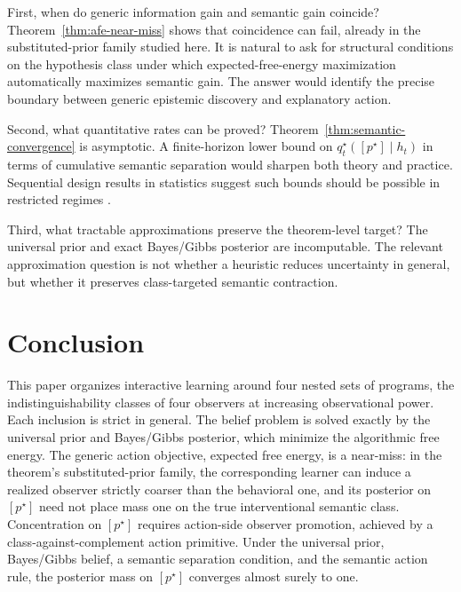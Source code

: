 \documentclass[11pt]{article}
\theoremstyle{definition}
\theoremstyle{remark}
\begin{document}
First, when do generic information gain and semantic gain coincide? Theorem~\ref{thm:afe-near-miss} shows that coincidence can fail, already in the substituted-prior family studied here. It is natural to ask for structural conditions on the hypothesis class under which expected-free-energy maximization automatically maximizes semantic gain. The answer would identify the precise boundary between generic epistemic discovery and explanatory action.

Second, what quantitative rates can be proved? Theorem~\ref{thm:semantic-convergence} is asymptotic. A finite-horizon lower bound on $q_t^\star([p^\star]\mid h_t)$ in terms of cumulative semantic separation would sharpen both theory and practice. Sequential design results in statistics suggest such bounds should be possible in restricted regimes \citep{Chernoff1959,BoxHill1967}.

Third, what tractable approximations preserve the theorem-level target? The universal prior and exact Bayes/Gibbs posterior are incomputable. The relevant approximation question is not whether a heuristic reduces uncertainty in general, but whether it preserves class-targeted semantic contraction.

\section{Conclusion}
\label{sec:conclusion}

This paper organizes interactive learning around four nested sets of programs, the indistinguishability classes of four observers at increasing observational power. Each inclusion is strict in general. The belief problem is solved exactly by the universal prior and Bayes/Gibbs posterior, which minimize the algorithmic free energy. The generic action objective, expected free energy, is a near-miss: in the theorem's substituted-prior family, the corresponding learner can induce a realized observer strictly coarser than the behavioral one, and its posterior on $[p^\star]$ need not place mass one on the true interventional semantic class. Concentration on $[p^\star]$ requires action-side observer promotion, achieved by a class-against-complement action primitive. Under the universal prior, Bayes/Gibbs belief, a semantic separation condition, and the semantic action rule, the posterior mass on $[p^\star]$ converges almost surely to one.



\end{document}
